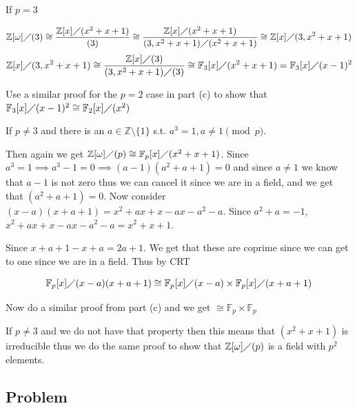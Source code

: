 \documentclass[12pt, letterpaper]{article}
\newcounter{problem}
\newcommand{\q}{
    \newpage %
    \stepcounter{problem} %
    \subsection*{Problem \arabic{problem}} %
}
\newcommand{\Z}{\mathbb{Z}}
\newcommand{\F}{\mathbb{F}}
\begin{document}
\begin{enumerate}[(a)]
    If $p=3$

    \[\Z[\omega]\diagup (3) \cong \dfrac{\Z[x] \diagup (x^2+x+1)}{(3)} \cong \dfrac{\Z[x] \diagup (x^2+x+1)}{(3,x^2+x+1) \diagup (x^2+x+1)} \cong \Z[x] \diagup (3,x^2+x+1)\]
    \[\Z[x] \diagup (3,x^2+x+1) \cong \dfrac{\Z[x] \diagup (3)}{(3,x^2+x+1) \diagup (3)} \cong \F_3[x] \diagup (x^2+x+1)=\F_3[x] \diagup (x-1)^2\]

    Use a similar proof for the $p=2$ case in part (c) to show that $\F_3[x] \diagup (x-1)^2 \cong \F_2[x] \diagup (x^2)$

    If $p \neq 3$ and there is an $a \in \Z \setminus \{1\}$ s.t. $a^3 = 1,a\neq 1 \pmod{p}$.

    Then again we get $\Z[\omega] \diagup (p) \cong \F_p[x] \diagup (x^2+x+1)$. Since $a^3 = 1 \implies a^3-1=0 \implies (a-1)(a^2+a+1)=0$ and since $a \neq 1$ we know that $a-1$ is not zero thus we can cancel it since we are in a field, and we get that $(a^2+a+1)=0$. Now consider $(x-a)(x+a+1)=x^2+ax+x-ax-a^2-a$. Since $a^2+a=-1$, $x^2+ax+x-ax-a^2-a=x^2+x+1$.

    Since $x+a+1-x+a=2a+1$. We get that these are coprime since we can get to one since we are in a field. Thus by CRT

    \[\F_p[x] \diagup (x-a)(x+a+1) \cong \F_p[x] \diagup (x-a) \times \F_p[x] \diagup (x+a+1)\]

    Now do a similar proof from part (c) and we get $\cong \F_p \times \F_p$

    If $p \neq 3$ and we do not have that property then this means that $(x^2+x+1)$ is irreducible thus we do the same proof to show that $\Z[\omega] \diagup (p)$ is a field with $p^2$ elements.
 \end{enumerate}

 \q
\end{document}
